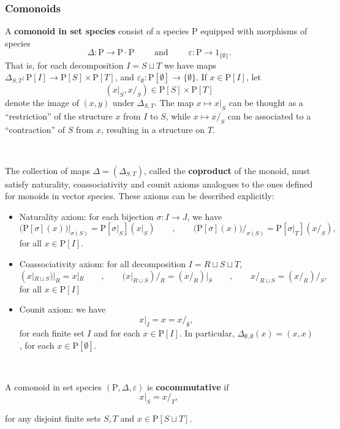 \documentclass[12pt, reqno]{amsart}
\theoremstyle{definition}
\newcommand{\rP}{\mathrm{P}}
\begin{document}
\subsubsection{Comonoids}
A {\bf comonoid in set species} consist of a species $\rP$ equipped with morphisms of species
\[\Delta:\rP \to \rP \cdot \rP \qquad \text{ and } \qquad \varepsilon: \rP \to \mathrm{1}_{\{\emptyset \} }. \]
That is, for each decomposition $I=S \sqcup T$ we have maps $\Delta_{S,T}: \rP[I]\to \rP[S] \times \rP[T]$, and $\varepsilon_\emptyset: \rP[\emptyset] \to \{\emptyset\}$. If $x \in \rP[I]$,  let 
\[(x|_S, x /_S)\in \rP[S]\times \rP[T]\]
denote the image of $(x,y)$ under $\Delta_{S,T}$. The map $x \mapsto x|_S$ can be thought as a ``restriction'' of the structure $x$ from $I$ to $S$, while $x \mapsto x/_S$ can be associated to a ``contraction'' of $S$ from $x$, resulting in a structure on $T$.

\

The collection of maps $\Delta=(\Delta_{S,T})$, called the {\bf coproduct} of the monoid, must satisfy naturality, coassociativity and counit axioms analogues to the ones defined for monoids in vector species.
These axioms can be described explicitly:
\begin{itemize}
    \item Naturality axiom: for each bijection $\sigma: I \to J$,  we have
\[{\Big (}\rP[\sigma](x){\Big )}\Big|_{\sigma(S)}=\rP[\sigma|_S](x|_S) \qquad , \qquad {\Big (}\rP[\sigma](x){\Big )}\Big/_{\sigma(S)}=\rP[\sigma|_T](x/_S),\]
for all $x \in \rP[I]$.
\vspace{.1in}
\item Coassociativity axiom: for all decomposition $I=R \sqcup S \sqcup T$, \[(x|_{R\sqcup S})|_R=x|_R \qquad , \qquad (x|_{R\sqcup S})/_R=(x/_R)|_S \qquad , \qquad x/_{R \sqcup S}=(x/_R)/_S, \]
for all $x \in \rP[I]$
\vspace{.1in}
\item Counit axiom: we have
\[x|_I= x = x/_\emptyset,\]
for each finite set $I$ and for each $x \in \rP[I]$. In particular, $\Delta_{\emptyset, \emptyset}(x)=(x,x)$, for each $x \in \rP[\emptyset]$.
\end{itemize}

\


A comonoid in set species $(\rP, \Delta, \varepsilon)$ is {\bf cocommutative} if
\[x|_S=x/_T,\]

for any disjoint finite sets $S, T$ and $x \in \rP[S\sqcup T]$.

\
\end{document}
